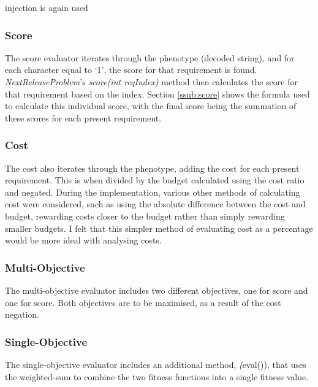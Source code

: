 \documentclass[11pt, a4paper]{article}
\begin{document}
injection is again used

\subsubsection{Score} %
\label{ssub:impl_score}
The score evaluator iterates through the phenotype (decoded string), and for
each character equal to `1', the score for that requirement is found.
\emph{NextReleaseProblem}'s \emph{score(int reqIndex)} method then calculates
the score for that requirement based on the index. Section \ref{ssub:score}
shows the formula used to calculate this individual score, with the final score
being the summation of these scores for each present requirement.

\subsubsection{Cost} %
\label{ssub:impl_cost}
The cost also iterates through the phenotype, adding the cost for each present
requirement. This is when divided by the budget calculated using the cost ratio
and negated. During the implementation, various other methods of calculating
cost were considered, such as using the absolute difference between the cost and
budget, rewarding costs closer to the budget rather than simply rewarding
smaller budgets. I felt that this simpler method of evaluating cost as a
percentage would be more ideal with analysing costs.

\subsubsection{Multi-Objective} %
\label{ssub:impl_multi_objective}
The multi-objective evaluator includes two different objectives, one for score
and one for score. Both objectives are to be maximised, as a result of the cost
negation.

\subsubsection{Single-Objective} %
\label{ssub:impl_single_objective}
The single-objective evaluator includes an additional method, \emph(eval()),
that uses the weighted-sum to combine the two fitness functions into a single
fitness value.
\end{document}
